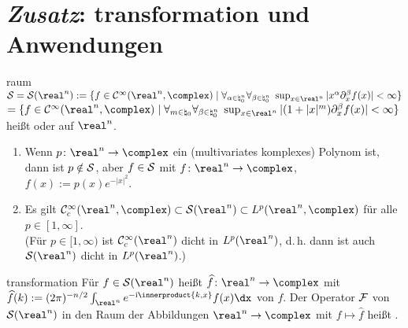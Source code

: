 \pagebreak

\section{%
    \emph{Zusatz}: transformation und Anwendungen%
}

\begin{Def}{raum}
    $\S = \S(\real^n) :=
    \{f \in \C^\infty(\real^n, \complex) \;|\;
    \forall_{\alpha\in\natural_0^n} \forall_{\beta\in\natural_0^n}\;
    \sup_{x \in \real^n} |x^\alpha \partial_x^\beta f(x)| < \infty\}$\\
    $= \{f \in \C^\infty(\real^n, \complex) \;|\;
    \forall_{m \in \natural_0} \forall_{\beta \in \natural_0^n}\;
    \sup_{x \in \real^n} |(1 + |x|^m) \partial_x^\beta f(x)| < \infty\}$\\
    heißt  oder
     auf $\real^n$.
\end{Def}

\begin{Bem}
    \begin{enumerate}
        \item
        Wenn $p\colon \real^n \rightarrow \complex$ ein
        (multivariates komplexes) Polynom ist, dann ist $p \notin \S$,
        aber $f \in \S$ mit $f\colon \real^n \rightarrow \complex$, $f(x) := p(x) e^{-|x|^2}$.

        \item
        Es gilt $\C^\infty_c(\real^n, \complex) \subset \S(\real^n) \subset L^p(\real^n, \complex)$
        für alle $p \in [1, \infty]$.\\
        (Für $p \in [1, \infty)$ ist $\C^\infty_c(\real^n)$ dicht in $L^p(\real^n)$,
        d.\,h. dann ist auch $\S(\real^n)$ dicht in $L^p(\real^n)$.)
    \end{enumerate}
\end{Bem}

\linie

\begin{Def}{transformation}
    Für $f \in \S(\real^n)$ heißt $\widehat{f}\colon \real^n \rightarrow \complex$ mit\\
    $\widehat{f}(k) := (2\pi)^{-n/2} \int_{\real^n} e^{-\iu\innerproduct{k,x}} f(x)\dx$
     von $f$.
    Der Operator $\F$ von $\S(\real^n)$ in den Raum der Abbildungen $\real^n \rightarrow \complex$
    mit $f \mapsto \widehat{f}$ heißt .
\end{Def}

